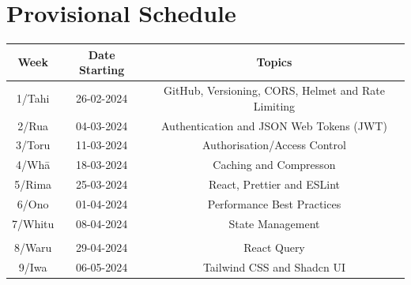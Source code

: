 \documentclass{article}
\begin{document}
\section*{Provisional Schedule}
\renewcommand{\arraystretch}{1.5} 
\begin{tabular}{|c|c|c|c|}
	\hline
	\textbf{Week}                  & \textbf{Date Starting}            & \multicolumn{2}{c|}{\textbf{Topics}}                                                                                             \\ \hline
	\footnotesize 1/Tahi           & \footnotesize 26-02-2024 & \multicolumn{2}{c|}{\footnotesize GitHub, Versioning, CORS, Helmet and Rate Limiting}    \\ \hline
	\footnotesize 2/Rua            & \footnotesize 04-03-2024 & \multicolumn{2}{c|}{\footnotesize Authentication and JSON Web Tokens (JWT)}                   \\ \hline
	\footnotesize 3/Toru           & \footnotesize 11-03-2024 & \multicolumn{2}{c|}{\footnotesize Authorisation/Access Control} \\ \hline
	\footnotesize 4/Whā            & \footnotesize 18-03-2024 & \multicolumn{2}{c|}{\footnotesize Caching and Compresson}                               \\ \hline
	\footnotesize 5/Rima           & \footnotesize 25-03-2024 & \multicolumn{2}{c|}{\footnotesize React, Prettier and ESLint}                                                \\ \hline
	\footnotesize 6/Ono            & \footnotesize 01-04-2024  & \multicolumn{2}{c|}{\footnotesize Performance Best Practices}                                                   \\ \hline
	\footnotesize 7/Whitu          & \footnotesize 08-04-2024 &  \multicolumn{2}{c|}{\footnotesize State Management}                            \\ \hline
	\rowcolor{yellow} \multicolumn{4}{|c|}{\footnotesize Mid Term Break}                                                                                                                         \\ \hline
	\footnotesize 8/Waru   & \footnotesize 29-04-2024 & \multicolumn{2}{c|}{\footnotesize React Query}                                                   \\ \hline
	\footnotesize 9/Iwa            & \footnotesize 06-05-2024 & \multicolumn{2}{c|}{\footnotesize Tailwind CSS and Shadcn UI}                                                                 \\ \hline

\end{tabular}
\end{document}
